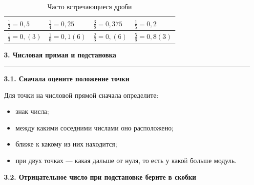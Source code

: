 \documentclass[a4paper,12pt]{article}
\newcommand{\topic}[1]{%
  \vspace{0.3em}
  {\Large\bfseries\textcolor{darkaccent}{#1}}\par
  \vspace{0.3em}
  \noindent\textcolor{accent}{\rule{\linewidth}{0.7pt}}\par
  \vspace{0.5em}
}
\newcommand{\subtopic}[1]{%
  \vspace{0.6em}
  {\large\bfseries\textcolor{darkaccent}{#1}}\par
  \vspace{0.15em}
}
\begin{document}
\begin{table}[ht]
\centering
\caption{Часто встречающиеся дроби}

\begin{tabularx}{\linewidth}{
  @{}
  >{\centering\arraybackslash}X
  >{\centering\arraybackslash}X
  >{\centering\arraybackslash}X
  >{\centering\arraybackslash}X
  @{}
}
\toprule
\(\frac12=0{,}5\) &
\(\frac14=0{,}25\) &
\(\frac38=0{,}375\) &
\(\frac15=0{,}2\)
\\
\midrule
\(\frac13=0{,}(3)\) &
\(\frac16=0{,}1(6)\) &
\(\frac23=0{,}(6)\) &
\(\frac56=0{,}8(3)\)
\\
\bottomrule
\end{tabularx}
\end{table}


\topic{3. Числовая прямая и подстановка}

\subtopic{3.1. Сначала оцените положение точки}

Для точки на числовой прямой сначала определите:

\begin{itemize}
  \item знак числа;
  \item между какими соседними числами оно расположено;
  \item ближе к какому из них находится;
  \item при двух точках --- какая дальше от нуля, то есть у какой больше модуль.
\end{itemize}

\begin{center}
\end{center}

\subtopic{3.2. Отрицательное число при подстановке берите в скобки}
\end{document}
